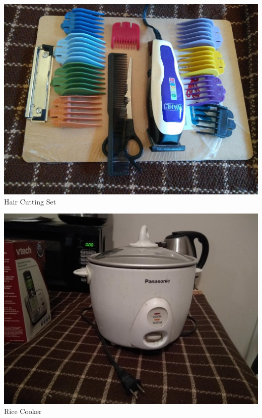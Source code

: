 \documentclass[t]{beamer}
\newcommand{\htarget}[2]{\hypertarget{#1}{#2}}
\begin{document}
\begin{frame}\htarget{hair}{} \begin{center}
\includegraphics[height=0.8\textheight]{haircutting_set_mini.jpg} \\
Hair Cutting Set
\end{center} \end{frame}
\begin{frame}\htarget{rice}{} \begin{center}
\includegraphics[height=0.8\textheight]{rice_cooker_mini.jpg} \\
Rice Cooker
\end{center} \end{frame}
\end{document}
